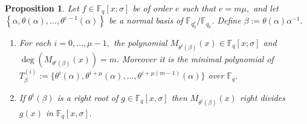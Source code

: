 \documentclass[12pt,paper]{article}
\theoremstyle{plain}
\newtheorem{proposition}[theorem]{Proposition}
\newcommand{\Fq}{\mathbb{F}_{q}}
\DeclareMathOperator{\lclm}{lclm}
\begin{document}
\begin{proposition}\label{mu-closed}
Let $f\in \Fq[x;\sigma]$ be of order $e$ such that $e=m \mu,$ and  let $\left\{\alpha, \theta(\alpha), \ldots, \theta^{e-1}(\alpha)\right\}$ be a normal basis of $ \mathbb{F}_{q_0^e}/\mathbb{F}_{q_0}$. Define $\beta:=\theta(\alpha) \alpha^{-1}.$ 
\begin{enumerate}
    \item For each $ i=0,\ldots, \mu-1,$   the polynomial $ M_{\theta^i(\beta)}(x)\in \Fq[x;\sigma] $ and $ \deg(M_{\theta^i(\beta)}(x) )= m.$
   Moreover it is  the minimal polynomial of $ T_{\beta}^{(i)}:= \{ \theta^i(\alpha), \theta^{i+\mu}(\alpha), \ldots, \theta^{i+\mu(m-1)}(\alpha)\}$ over $\Fq.$ 
    \item If $ \theta^{i}(\beta)$ is a right root of $g\in \Fq[x,\sigma]$ then $ M_{\theta^i(\beta)}(x) $ right divides $ g(x)$ in $\Fq[x,\sigma].$
    \end{enumerate}
\end{proposition}
\end{document}

